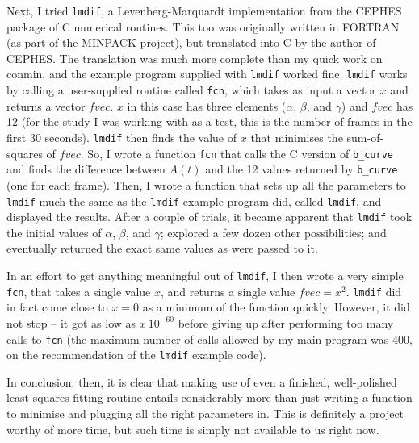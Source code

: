 Next, I tried \verb|lmdif|, a Levenberg-Marquardt implementation from
the CEPHES package of C numerical routines.  This too was originally
written in FORTRAN (as part of the MINPACK project), but translated
into C by the author of CEPHES.  The translation was much more
complete than my quick work on conmin, and the example program
supplied with \verb|lmdif| worked fine.  \verb|lmdif| works by calling
a user-supplied routine called \verb|fcn|, which takes as input a
vector $x$ and returns a vector $fvec$.  $x$ in this case has three
elements ($\alpha$, $\beta$, and $\gamma$) and $fvec$ has 12 (for the
study I was working with as a test, this is the number of frames in
the first 30 seconds).
\verb|lmdif| then finds the value of $x$ that minimises the sum-of-squares of
$fvec$.  So, I wrote a function \verb|fcn| that calls the C version of
\verb|b_curve| and finds the difference between $A(t)$ and the 12 values
returned by \verb|b_curve| (one for each frame).  Then, I wrote a
function that sets up all the parameters to \verb|lmdif| much the same
as the \verb|lmdif| example program did, called \verb|lmdif|, and
displayed the results.  After a couple of trials, it became apparent
that \verb|lmdif| took the initial values of $\alpha$, $\beta$, and
$\gamma$; explored a few dozen other possibilities; and eventually
returned the exact same values as were passed to it.

In an effort to get anything meaningful out of \verb|lmdif|, I then
wrote a very simple \verb|fcn|, that takes a single value $x$, and
returns a single value $fvec = x^{2}$.  \verb|lmdif| did in fact come
close to $x=0$ as a minimum of the function quickly.  However, it did
not stop -- it got as low as $x ~ 10^{-60}$ before giving up after
performing too many calls to \verb|fcn| (the maximum number of calls
allowed by my main program was 400, on the recommendation of the
\verb|lmdif| example code).

In conclusion, then, it is clear that making use of even a finished,
well-polished least-squares fitting routine entails considerably more
than just writing a function to minimise and plugging all the right
parameters in.  This is definitely a project worthy of more time, but
such time is simply not available to us right now.


